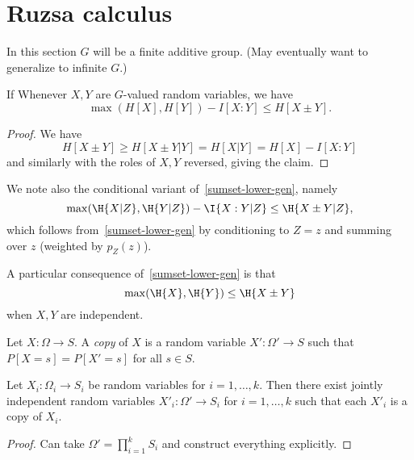 \chapter{Ruzsa calculus}

In this section $G$ will be a finite additive group.  (May eventually want to generalize to infinite $G$.)

\begin{lemma}\label{sumset-lower-gen}  If
Whenever $X,Y$ are $G$-valued random variables, we have
$$ \max(H[X], H[Y]) - I[X:Y] \leq H[X \pm Y].$$
\end{lemma}

\begin{proof}  We have
$$
 H[X\pm Y] \geq H[X\pm Y|Y] = H[X|Y]= H[X] - I[X:Y]
$$
and similarly with the roles of $X,Y$ reversed, giving the claim.
\end{proof}



We note also the conditional variant of~\eqref{sumset-lower-gen}, namely
\[
  \max(\H{X|Z}, \H{Y|Z}) - \I{X:Y|Z} \leq \H{X\pm Y|Z},
\]
which follows from~\eqref{sumset-lower-gen} by conditioning to $Z = z$ and summing over $z$ (weighted by $p_Z(z)$).

A particular consequence of~\eqref{sumset-lower-gen} is that
\begin{equation}
  \label{sumset-lower}
  \max(\H{X}, \H{Y}) \leq \H{X\pm Y}
\end{equation}
when $X,Y$ are independent.

\begin{definition}[Copy]\label{copy-def}  Let $X : \Omega \to S$.  A \emph{copy} of $X$ is a random variable $X' : \Omega' \to S$ such that $P[X=s] = P[X'=s]$ for all $s \in S$.
\end{definition}

\begin{lemma}\label{independent-exist}  Let $X_i : \Omega_i \to S_i$ be random variables for $i=1,\dots,k$.  Then there exist jointly independent random variables $X'_i: \Omega' \to S_i$ for $i=1,\dots,k$ such that each $X'_i$ is a copy of $X_i$.
\end{lemma}

\begin{proof} Can take $\Omega' = \prod_{i=1}^k S_i$ and construct everything explicitly.
\end{proof}



